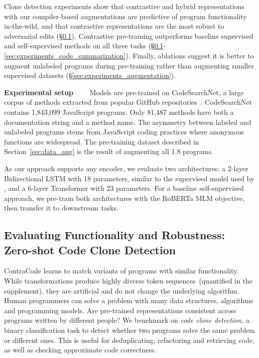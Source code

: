 \documentclass{article}
\newcommand{\million}[0]{}
\newcommand{\ours}[0]{ContraCode}
\begin{document}
Clone detection experiments show that contrastive and hybrid representations with our compiler-based augmentations are predictive of program functionality in-the-wild, and that contrastive representations are the most robust to adversarial edits (\S\ref{sec:experiments_code_clone}).
Contrastive pre-training outperforms baseline supervised and self-supervised methods on all three tasks (\S\ref{sec:experiments_code_clone}-\ref{sec:experiments_code_summarization}). Finally, ablations suggest it is better to augment unlabeled programs during pre-training rather than augmenting smaller supervised datasets (\S\ref{sec:experiments_augmentation}).

\textbf{Experimental setup}~~~~
Models are pre-trained on CodeSearchNet, a large corpus of methods extracted from popular GitHub repositories~\citep{husain2019codesearchnet}. CodeSearchNet contains 1,843,099 JavaScript programs. Only 81,487 methods have both a documentation string and a method name. The asymmetry between labeled and unlabeled programs stems from JavaScript coding practices where anonymous functions are widespread. The pre-training dataset described in Section~\ref{sec:data_aug} is the result of augmenting all 1.8\million{} programs.

As our approach supports any encoder, we evaluate two architectures: a 2-layer Bidirectional LSTM with 18\million{} parameters, similar to the supervised model used by \citet{hellendoorn2018deep}, and a 6-layer Transformer with 23\million{} parameters.
For a baseline self-supervised approach, we pre-train both architectures with the RoBERTa MLM objective, then transfer it to downstream tasks.

\subsection{Evaluating Functionality and Robustness: Zero-shot Code Clone Detection}
\label{sec:experiments_code_clone}

\ours{} learns to match variants of programs with similar functionality. While transformations produce highly diverse token sequences~(quantified in the supplement),
they are artificial and do not change the underlying algorithm. Human programmers can solve a problem with many data structures, algorithms and programming models. Are pre-trained representations consistent across programs written by different people? We benchmark on \textit{code clone detection}, a binary classification task to detect whether two programs solve the same problem or different ones. This is useful for deduplicating, refactoring and retrieving code, as well as checking approximate code correctness.
\end{document}
